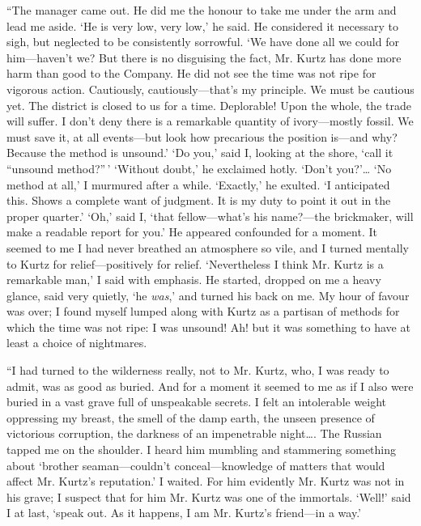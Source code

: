 \documentclass[12pt]{report}
\begin{document}
``The manager came out. He did me the honour to take me under the arm
and lead me aside. `He is very low, very low,' he said. He considered it
necessary to sigh, but neglected to be consistently sorrowful. `We have
done all we could for him---haven't we? But there is no disguising the
fact, Mr. Kurtz has done more harm than good to the Company. He did not
see the time was not ripe for vigorous action. Cautiously,
cautiously---that's my principle. We must be cautious yet. The district
is closed to us for a time. Deplorable! Upon the whole, the trade will
suffer. I don't deny there is a remarkable quantity of ivory---mostly
fossil. We must save it, at all events---but look how precarious the
position is---and why? Because the method is unsound.' `Do you,' said I,
looking at the shore, `call it ``unsound method?''\,' `Without doubt,'
he exclaimed hotly. `Don't you?'\ldots{} `No method at all,' I murmured
after a while. `Exactly,' he exulted. `I anticipated this. Shows a
complete want of judgment. It is my duty to point it out in the proper
quarter.' `Oh,' said I, `that fellow---what's his name?---the
brickmaker, will make a readable report for you.' He appeared confounded
for a moment. It seemed to me I had never breathed an atmosphere so
vile, and I turned mentally to Kurtz for relief---positively for relief.
`Nevertheless I think Mr. Kurtz is a remarkable man,' I said with
emphasis. He started, dropped on me a heavy glance, said very quietly,
`he \emph{was},' and turned his back on me. My hour of favour was over;
I found myself lumped along with Kurtz as a partisan of methods for
which the time was not ripe: I was unsound! Ah! but it was something to
have at least a choice of nightmares.

``I had turned to the wilderness really, not to Mr. Kurtz, who, I was
ready to admit, was as good as buried. And for a moment it seemed to me
as if I also were buried in a vast grave full of unspeakable secrets. I
felt an intolerable weight oppressing my breast, the smell of the damp
earth, the unseen presence of victorious corruption, the darkness of an
impenetrable night\ldots{}. The Russian tapped me on the shoulder. I
heard him mumbling and stammering something about `brother
seaman---couldn't conceal---knowledge of matters that would affect Mr.
Kurtz's reputation.' I waited. For him evidently Mr. Kurtz was not in
his grave; I suspect that for him Mr. Kurtz was one of the immortals.
`Well!' said I at last, `speak out. As it happens, I am Mr. Kurtz's
friend---in a way.'
\end{document}
